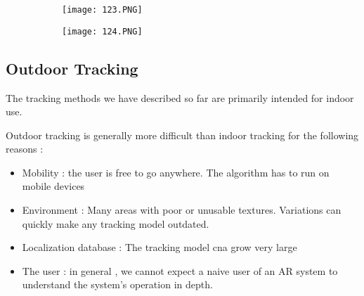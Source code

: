 \documentclass{article}
\begin{document}
\begin{figure}[ht!]
  \centering
  \begin{subfigure}[b]{0.4\linewidth}
    \texttt{[image: 123.PNG]}
  \end{subfigure}
  \begin{subfigure}[b]{0.4\textwidth}
         \centering
         \texttt{[image: 124.PNG]}
     \end{subfigure}
\end{figure}

\subsection{Outdoor Tracking}

The tracking methods we have described so far are primarily intended for indoor use.

Outdoor tracking is generally more difficult than indoor tracking for the following reasons :

\begin{itemize}
    \item Mobility : the user is free to go anywhere. The algorithm has to run on mobile devices
    \item Environment : Many areas with poor or unusable textures. Variations can quickly make any tracking model outdated.
    \item Localization database : The tracking model cna grow very large
    \item The user : in general , we cannot expect a naive user of an AR system to understand the system's operation in depth.
\end{itemize}
\end{document}
